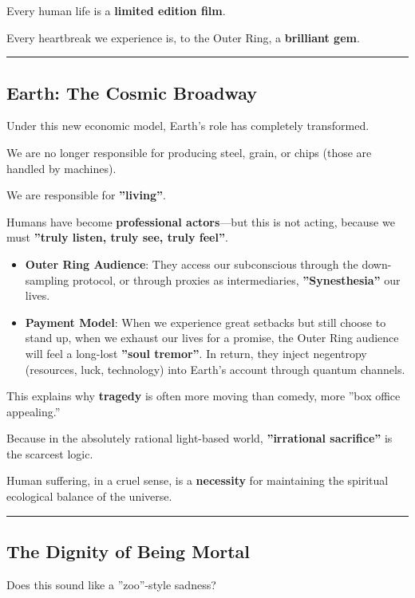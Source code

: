 Every human life is a \textbf{limited edition film}.

Every heartbreak we experience is, to the Outer Ring, a \textbf{brilliant gem}.

\hrule

\subsection{Earth: The Cosmic Broadway}

Under this new economic model, Earth's role has completely transformed.

We are no longer responsible for producing steel, grain, or chips (those are handled by machines).

We are responsible for \textbf{''living''}.

Humans have become \textbf{professional actors}---but this is not acting, because we must \textbf{''truly listen, truly see, truly feel''}.

\begin{itemize}
\item \textbf{Outer Ring Audience}: They access our subconscious through the down-sampling protocol, or through proxies as intermediaries, \textbf{''Synesthesia''} our lives.

\item \textbf{Payment Model}: When we experience great setbacks but still choose to stand up, when we exhaust our lives for a promise, the Outer Ring audience will feel a long-lost \textbf{''soul tremor''}. In return, they inject negentropy (resources, luck, technology) into Earth's account through quantum channels.
\end{itemize}

This explains why \textbf{tragedy} is often more moving than comedy, more ''box office appealing.''

Because in the absolutely rational light-based world, \textbf{''irrational sacrifice''} is the scarcest logic.

Human suffering, in a cruel sense, is a \textbf{necessity} for maintaining the spiritual ecological balance of the universe.

\hrule

\subsection{The Dignity of Being Mortal}

Does this sound like a ''zoo''-style sadness?

